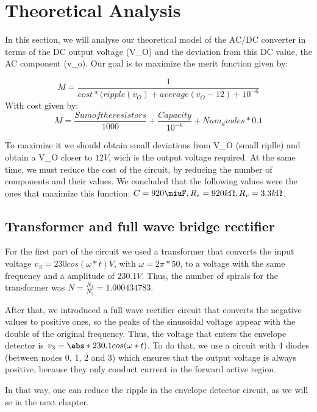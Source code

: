 \section{Theoretical Analysis}
\label{sec:analysis}

\par In this section, we will analyse our theoretical model of the AC/DC converter in terms of the DC output voltage (V_O) and the deviation from this DC value, the AC component (v_o). Our goal is to maximize the merit function given by:

\begin{equation}
M=\frac{1}{cost*(ripple(v_O)+average(v_O-12)+10^{-6}}
  \label{eq:merit}
\end{equation}
With cost given by:
\begin{equation}
M=\frac{Sum of the resistors}{1000}+\frac{Capacity}{10^{-6}}+Num_diodes*0.1
  \label{eq:cost}
\end{equation}
 
\par To maximize it we should obtain small deviations from V_O (small riplle) and obtain a V_O closer to $12V$, wich is the output voltage required. At the same time, we must reduce the cost of the circuit, by reducing the number of components and their values. We concluded that the following values were the ones that maximize this function: $C=920\miuF , R_e=920k\Omega , R_v=3.3k\Omega$.
 
\subsection{Transformer and full wave bridge rectifier}
\label{subsec:full_wave_rectifier}

\par For the first part of the circuit we used a transformer that converts the input voltage $v_S=230cos(\omega*t) V$, with $\omega=2\pi*50$, to a voltage with the same frequency and a amplitude of $230.1V$. Thus, the number of spirals for the transformer was $N=\frac{N_1}{N_2}=1.000434783$.

\par After that, we introduced a full wave rectifier circuit that converts the negative values to positive ones, so the peaks of the sinusoidal voltage appear with the double of the original frequency. Thus, the voltage that enters the envelope detector is $v_3=\abs*{230.1cos(\omega*t)}$. To do that, we use a circuit with 4 diodes (between nodes 0, 1, 2 and 3) which ensures that the output voltage is always positive, because they only conduct current in the forward active region.
\par In that way, one can reduce the ripple in the envelope detector circuit, as we will se in the next chapter.

